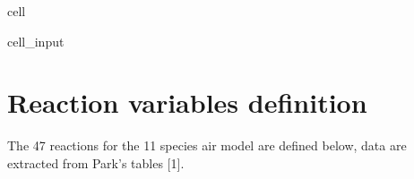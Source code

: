 \documentclass[letterpaper,10pt,english]{jupyterBook}
\begin{document}
\begin{sphinxuseclass}{cell}\begin{sphinxVerbatimInput}

\begin{sphinxuseclass}{cell_input}
\begin{sphinxVerbatim}[commandchars=\\\{\}]
 
       
          \PYG{p}{[}\PYG{p}{]}
                     
                 
    
    
      
              
          
\end{sphinxVerbatim}

\end{sphinxuseclass}\end{sphinxVerbatimInput}

\end{sphinxuseclass}

\chapter{Reaction variables definition}
\label{\detokenize{1_Temperature/Reaction_class_definition:reaction-variables-definition}}
\sphinxAtStartPar
The 47 reactions for the 11 species air model are defined below, data are extracted from Park’s tables {[}1{]}.
\end{document}

